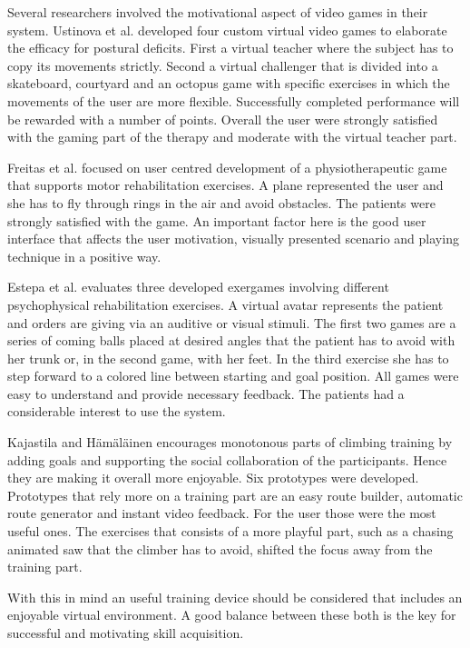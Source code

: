 Several researchers involved the motivational aspect of video games in their system. Ustinova et al. \cite{Ustinova2014-ml} developed four custom virtual video games to elaborate the efficacy for postural deficits. First a virtual teacher where the subject has to copy its movements strictly. Second a virtual challenger that is divided into a skateboard, courtyard and an octopus game with specific exercises in which the movements of the user are more flexible. Successfully completed performance will be rewarded with a number of points. Overall the user were strongly satisfied with the gaming part of the therapy and moderate with the virtual teacher part.

Freitas et al. \cite{Freitas2012-ae} focused on user centred development of a physiotherapeutic game that supports motor rehabilitation exercises. A plane represented the user and she has to fly through rings in the air and avoid obstacles. The patients were strongly satisfied with the game. An important factor here is the good user interface that affects the user motivation, visually presented scenario and playing technique in a positive way.

Estepa et al. \cite{Estepa2016-oj} evaluates three developed exergames involving different psychophysical rehabilitation exercises. A virtual avatar represents the patient and orders are giving via an auditive or visual stimuli. The first two games are a series of coming balls placed at desired angles that the patient has to avoid with her trunk or, in the second game, with her feet. In the third exercise she has to step forward to a colored line between starting and goal position. All games were easy to understand and provide necessary feedback. The patients had a considerable interest to use the system.

Kajastila and Hämäläinen \cite{Kajastila2014-ug} encourages monotonous parts of climbing training by adding goals and supporting the social collaboration of the participants. Hence they are making it overall more enjoyable. Six prototypes were developed. Prototypes that rely more on a training part are an easy route builder, automatic route generator and instant video feedback. For the user those were the most useful ones. The exercises that consists of a more playful part, such as a chasing animated saw that the climber has to avoid, shifted the focus away from the training part. 

With this in mind an useful training device should be considered that includes an enjoyable virtual environment. A good balance between these both is the key for successful and motivating skill acquisition.

